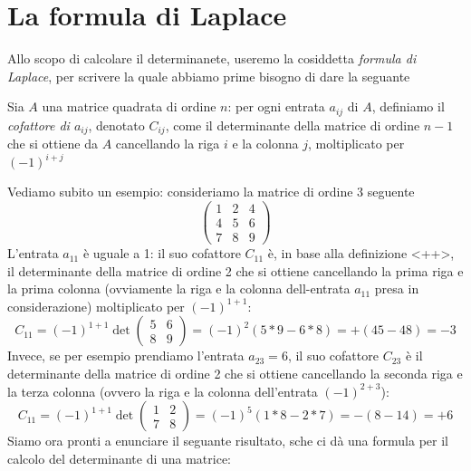 \section{La formula di Laplace \label{Laplace}}
Allo scopo di calcolare il determinanete, useremo la cosiddetta \textit{formula di Laplace}, per scrivere la quale abbiamo prime bisogno di dare la seguante
\begin{definizione}
Sia $A$ una matrice quadrata di ordine $n$: per ogni entrata $a_{ij}$ di $A$, definiamo il \textit{cofattore di $a_{ij}$}, denotato $C_{ij}$, come il determinante della matrice di ordine $n-1$ che si ottiene da $A$ cancellando la riga $i$ e la colonna $j$, moltiplicato per $(-1)^{i+j}$
\end{definizione}
Vediamo subito un esempio: consideriamo la matrice di ordine 3 seguente
\begin{equation*}
  \begin{pmatrix}
    1 & 2 & 4 \\
    4 & 5 & 6 \\
    7 & 8 & 9
  \end{pmatrix}
\end{equation*}
L'entrata $a_{11}$ è uguale a 1: il suo cofattore $C_{11}$ è, in base alla definizione <++>, il determinante della matrice di ordine 2 che si ottiene cancellando la prima riga e la prima colonna (ovviamente la riga e la colonna dell-entrata $a_{11}$ presa in considerazione) moltiplicato per $(-1)^{1+1}$:
\begin{equation*}
	C_{11}=(-1)^{1+1}\det\begin{pmatrix} 5 & 6\\ 8 & 9 \end{pmatrix} = (-1)^2(5*9-6*8)=+(45-48)=-3
\end{equation*}
Invece, se per esempio prendiamo l'entrata $a_{23}=6$, il suo cofattore $C_{23}$ è il determinante della matrice di ordine 2 che si ottiene cancellando la seconda riga e la terza colonna (ovvero la riga e la colonna dell'entrata $(-1)^{2+3}$):
\begin{equation*}
	C_{11}=(-1)^{1+1}\det\begin{pmatrix} 1 & 2 \\ 7 & 8 \end{pmatrix} = (-1)^5(1*8-2*7)=-(8-14)=+6
\end{equation*}
Siamo ora pronti a enunciare il seguante risultato, sche ci dà una formula per il calcolo del determinante di una matrice:
